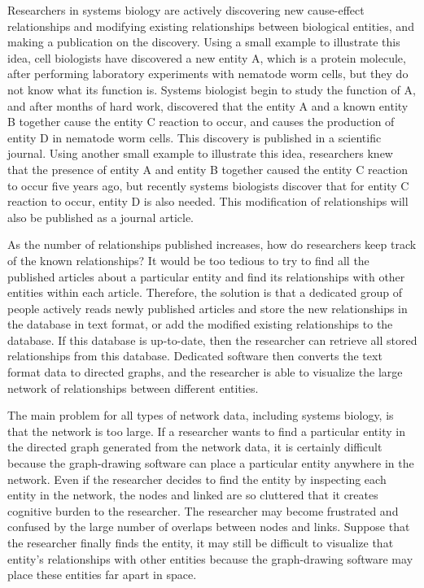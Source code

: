 \documentclass[journal]{vgtc}                %
\begin{document}
Researchers in systems biology are actively discovering new cause-effect relationships and modifying existing relationships between biological entities, and making a publication on the discovery. Using a small example to illustrate this idea, cell biologists have discovered a new entity A, which is a protein molecule, after performing laboratory experiments with nematode worm cells, but they do not know what its function is. Systems biologist begin to study the function of A, and after months of hard work, discovered that the entity A and a known entity B together cause the entity C reaction to occur, and causes the production of entity D in nematode worm cells. This discovery is published in a scientific journal. Using another small example to illustrate this idea, researchers knew that the presence of entity A and entity B together caused the entity C reaction to occur five years ago, but recently systems biologists discover that for entity C reaction to occur, entity D is also needed. This modification of relationships will also be published as a journal article. 

As the number of relationships published increases, how do researchers keep track of the known relationships? It would be too tedious to try to find all the published articles about a particular entity and find its relationships with other entities within each article. Therefore, the solution is that a dedicated group of people actively reads newly published articles and store the new relationships in the database in text format, or add the modified existing relationships to the database. If this database is up-to-date, then the researcher can retrieve all stored relationships from this database. Dedicated software then converts the text format data to directed graphs, and the researcher is able to visualize the large network of relationships between different entities. 

The main problem for all types of network data, including systems biology, is that the network is too large. If a researcher wants to find a particular entity in the directed graph generated from the network data, it is certainly difficult because the graph-drawing software can place a particular entity anywhere in the network. Even if the researcher decides to find the entity by inspecting each entity in the network, the nodes and linked are so cluttered that it creates cognitive burden to the researcher. The researcher may become frustrated and confused by the large number of overlaps between nodes and links. Suppose that the researcher finally finds the entity, it may still be difficult to visualize that entity’s relationships with other entities because the graph-drawing software may place these entities far apart in space.
\end{document}
